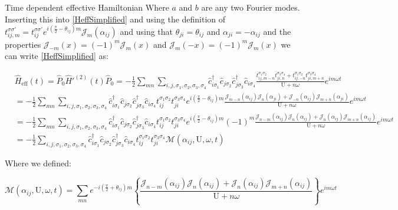 \begin{section}{Time dependent effective Hamiltonian}
Where $a$ and $b$ are any two Fourier modes. Inserting this into \ref{HeffSimplified} and using the definition of $t_{ij,m}^{\sigma \sigma'} = t_{ij}^{\sigma \sigma'} e^{i(\frac{\pi}{2}-\theta_{ij})m} \mathcal{J}_m(\alpha_{ij})$ and using that $\theta_{ji} = \theta_{ij}$ and $\alpha_{ji} = -\alpha_{ij}$ and the properties $\mathcal{J}_{-m}(x) = (-1)^m\mathcal{J}_m(x)$ and $\mathcal{J}_m(-x) = (-1)^m\mathcal{J}_m(x)$ we can write \ref{HeffSimplified} as:

\begin{align}
&\hat{H}_{\text{eff}}(t) = \hat{P}_0\hat{H}'^{(2)}(t)\hat{P}_0 = - \frac{1}{2}\sum_{mn} \sum_{i,j, \sigma_1, \sigma_2, \sigma_3, \sigma_4}\hat{c}_{i \sigma_1}^\dagger \hat{c}_{j \sigma_2} \hat{c}_{j \sigma_3}^\dagger \hat{c}_{i \sigma_4} \frac{t_{ij,m-n}^{\sigma_1 \sigma_2} t_{ji,n}^{\sigma_3 \sigma_4} + t_{ij,-n}^{\sigma_1 \sigma_2} t_{ji,m+n}^{\sigma_3 \sigma_4}}{\text{U}+n\omega} e^{im\omega t} \nonumber \\
&= - \frac{1}{2}\sum_{mn} \sum_{i,j, \sigma_1, \sigma_2, \sigma_3, \sigma_4}\hat{c}_{i \sigma_1}^\dagger \hat{c}_{j \sigma_2} \hat{c}_{j \sigma_3}^\dagger \hat{c}_{i \sigma_4} t_{ij}^{\sigma_1 \sigma_2} t_{ji}^{\sigma_3 \sigma_4} e^{i(\frac{\pi}{2}-\theta_{ij})m} \frac{ \mathcal{J}_{m-n}(\alpha_{ij}) \mathcal{J}_{n}(\alpha_{ji}) + \mathcal{J}_{-n}(\alpha_{ij}) \mathcal{J}_{m+n}(\alpha_{ji})}{\text{U}+n\omega} e^{im\omega t} \nonumber \\
&= - \frac{1}{2}\sum_{mn} \sum_{i,j, \sigma_1, \sigma_2, \sigma_3, \sigma_4}\hat{c}_{i \sigma_1}^\dagger \hat{c}_{j \sigma_2} \hat{c}_{j \sigma_3}^\dagger \hat{c}_{i \sigma_4} t_{ij}^{\sigma_1 \sigma_2} t_{ji}^{\sigma_3 \sigma_4} e^{i(\frac{\pi}{2}-\theta_{ij})m} (-1)^m \frac{ \mathcal{J}_{n-m}(\alpha_{ij}) \mathcal{J}_{n}(\alpha_{ij}) + \mathcal{J}_{n}(\alpha_{ij}) \mathcal{J}_{m+n}(\alpha_{ij})}{\text{U}+n\omega} e^{im\omega t} \nonumber \\
&= - \frac{1}{2} \sum_{i,j, \sigma_1, \sigma_2, \sigma_3, \sigma_4}\hat{c}_{i \sigma_1}^\dagger \hat{c}_{j \sigma_2} \hat{c}_{j \sigma_3}^\dagger \hat{c}_{i \sigma_4} t_{ij}^{\sigma_1 \sigma_2} t_{ji}^{\sigma_3 \sigma_4} \mathcal{M}(\alpha_{ij}, \text{U}, \omega, t) \label{HeffSimplified}
\end{align}

Where we defined:

\begin{equation}
\mathcal{M}(\alpha_{ij}, \text{U}, \omega, t) = \sum_{mn}e^{-i(\frac{\pi}{2}+\theta_{ij})m} \left\{ 
    \frac{\mathcal{J}_{n-m}(\alpha_{ij})\mathcal{J}_{n}(\alpha_{ij}) + \mathcal{J}_{n}(\alpha_{ij})\mathcal{J}_{m+n}(\alpha_{ij})}{\text{U}+n\omega} \right\}e^{im\omega t}
\end{equation}


\end{section}
